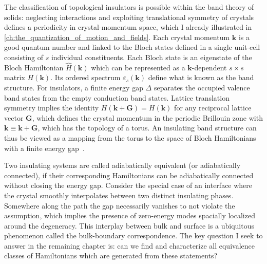 The classification of topological insulators is possible within the band theory of solids: neglecting interactions and exploiting translational symmetry of crystals defines a periodicity in crystal-momentum space, which I already illustrated in \cref{ch:the_quantization_of_motion_and_fields}.
Each crystal momentum ${\bm k}$ is a good quantum number and linked to the Bloch states defined in a single unit-cell consisting of $s$ individual constituents.
Each Bloch state is an eigenstate of the Bloch Hamiltonian $\hat H(\bm k)$ which can be represented as a $\bm k$-dependent $s\times s$ matrix $H(\bm k)$.
Its ordered spectrum $\varepsilon_s(\bm k)$ define what is known as the band structure.
For insulators, a finite energy gap $\Delta$ separates the occupied valence band states from the empty conduction band states.
Lattice translation symmetry implies the identity $H(\bm k + \bm G) = H(\bm k)$ for any reciprocal lattice vector $\bm G$, which defines the crystal momentum in the periodic Brillouin zone with $\bm k\equiv \bm k+\bm G$, which has the topology of a torus.
An insulating band structure can thus be viewed as a mapping from the torus to the space of Bloch Hamiltonians with a finite energy gap~\cite{Kane2013}.

Two insulating systems are called adiabatically equivalent (or adiabatically connected), if their corresponding Hamiltonians can be adiabatically connected without closing the energy gap.
Consider the special case of an interface where the crystal smoothly interpolates between two distinct insulating phases.
Somewhere along the path the gap necessarily vanishes to not violate the assumption, which implies the presence of zero-energy modes spacially localized around the degeneracy.
This interplay between bulk and surface is a ubiquitous phenomenon called the bulk-boundary correspondence.
The key question I seek to answer in the remaining chapter is: can we find and characterize all equivalence classes of Hamiltonians which are generated from these statements?

